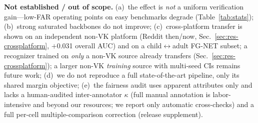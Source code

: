 \documentclass[journal]{IEEEtran}
\begin{document}
\noindent\textbf{Not established / out of scope.} (a)~the effect is \emph{not} a uniform verification gain---low-FAR operating points on easy benchmarks degrade (Table~\ref{tab:stats}); (b)~strong saturated backbones do not improve; (c)~cross-platform transfer is shown on an independent non-VK platform (Reddit then/now, Sec.~\ref{sec:res-crossplatform}, $+$0.031 overall AUC) and on a child$\leftrightarrow$adult FG-NET subset; a recognizer trained on \emph{only} a non-VK source already transfers (Sec.~\ref{sec:res-crossplatform}); a larger non-VK \emph{training} source with multi-seed CIs remains future work; (d)~we do not reproduce a full state-of-the-art pipeline, only its shared margin objective; (e)~the fairness audit uses apparent attributes only and lacks a human-audited inter-annotator $\kappa$ (full manual annotation is labor-intensive and beyond our resources; we report only automatic cross-checks) and a full per-cell multiple-comparison correction (release supplement).
\end{document}
